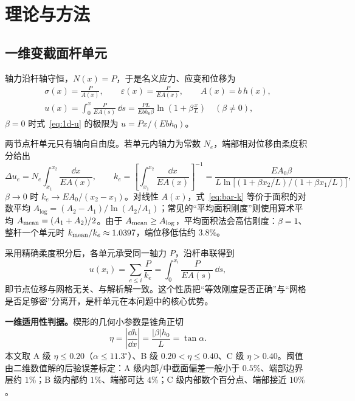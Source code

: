\section{理论与方法}

\subsection{一维变截面杆单元}

轴力沿杆轴守恒，$N(x)=P$，于是名义应力、应变和位移为
\begin{gather}
  \sigma(x)=\frac{P}{A(x)},\qquad
  \varepsilon(x)=\frac{P}{E A(x)},\qquad
  A(x)=b\,h(x), \label{eq:1d-fields}\\
  u(x)=\int_0^x \frac{P}{E A(s)}\,\dd s
      =\frac{P L}{E b h_0\beta}\ln\!\left(1+\beta\frac{x}{L}\right)
      \quad(\beta\neq0), \label{eq:1d-u}
\end{gather}
$\beta=0$ 时式~\eqref{eq:1d-u} 的极限为 $u=Px/(E b h_0)$。

两节点杆单元只有轴向自由度。若单元内轴力为常数 $N_e$，端部相对位移由柔度积分给出
\begin{equation}
  \Delta u_e=N_e\int_{x_1}^{x_2}\frac{\dd x}{E A(x)},
  \qquad
  k_e=\left[\int_{x_1}^{x_2}\frac{\dd x}{E A(x)}\right]^{-1}
      =\frac{E A_0\beta}{L\ln\!\big[(1+\beta x_2/L)/(1+\beta x_1/L)\big]},
  \label{eq:bar-k}
\end{equation}
$\beta\to0$ 时 $k_e\to EA_0/(x_2-x_1)$。对线性 $A(x)$，式~\eqref{eq:bar-k} 等价于面积的对数平均 $A_{\log}=(A_2-A_1)/\ln(A_2/A_1)$；常见的“平均面积刚度”则使用算术平均 $A_{\rm mean}=(A_1+A_2)/2$。由于 $A_{\rm mean}\ge A_{\log}$，平均面积法会高估刚度：$\beta=1$、整杆一个单元时 $k_{\rm mean}/k_e\approx1.0397$，端位移低估约 $3.8\%$。

采用精确柔度积分后，各单元承受同一轴力 $P$，沿杆串联得到
\begin{equation}
  u(x_i)=\sum_{e\le i}\frac{P}{k_e}=\int_0^{x_i}\frac{P}{E A(s)}\,\dd s,
  \label{eq:bar-exact}
\end{equation}
即节点位移与网格无关、与解析解一致。这个性质把“等效刚度是否正确”与“网格是否足够密”分离开，是杆单元在本问题中的核心优势。

\textbf{一维适用性判据。}楔形的几何小参数是锥角正切
\begin{equation}
  \eta=\left|\frac{\dd h}{\dd x}\right|=\frac{|\beta|h_0}{L}=\tan\alpha .
  \label{eq:eta}
\end{equation}
本文取 A 级 $\eta\le0.20$（$\alpha\le11.3^\circ$）、B 级 $0.20<\eta\le0.40$、C 级 $\eta>0.40$。阈值由二维数值解的后验误差标定：A 级内部/中截面偏差一般小于 $0.5\%$、端部边界层约 $1\%$；B 级内部约 $1\%$、端部可达 $4\%$；C 级内部数个百分点、端部接近 $10\%$。

